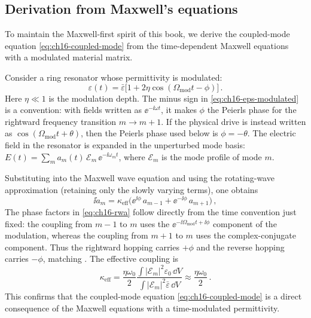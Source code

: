 \subsection{Derivation from Maxwell's equations}
\label{sec:ch16-maxwell-derivation}

To maintain the Maxwell-first spirit of this book, we derive the
coupled-mode equation \eqref{eq:ch16-coupled-mode} from the
time-dependent Maxwell equations with a modulated material matrix.

Consider a ring resonator whose permittivity is modulated:
\begin{equation}\label{eq:ch16-eps-modulated}
  \varepsilon(t) = \bar\varepsilon\bigl[1 + 2\eta\cos(\Omega_{\mathrm{mod}}t-\phi)\bigr] \,.
\end{equation}
Here $\eta\ll 1$ is the modulation depth.  The minus sign in
\eqref{eq:ch16-eps-modulated} is a convention: with fields written as
$\ee^{-\ii\omega t}$, it makes $\phi$ the Peierls phase for the
rightward frequency transition $m\to m+1$.  If the physical drive is
instead written as $\cos(\Omega_{\mathrm{mod}}t+\theta)$, then the
Peierls phase used below is $\phi=-\theta$.  The electric field in the
resonator is expanded in the unperturbed mode basis:
$E(t)=\sum_m a_m(t)\,\mathcal E_m\,\ee^{-\ii\omega_m t}$, where
$\mathcal E_m$ is the mode profile of mode $m$.

Substituting into the Maxwell wave equation and using the rotating-wave
approximation (retaining only the slowly varying terms), one obtains
\begin{equation}\label{eq:ch16-rwa}
  \ii\dot{a}_m = \kappa_{\mathrm{eff}}\bigl(\ee^{\ii\phi}\,a_{m-1}
  + \ee^{-\ii\phi}\,a_{m+1}\bigr)\,,
\end{equation}
The phase factors in \eqref{eq:ch16-rwa} follow directly from the
time convention just fixed: the coupling from $m-1$ to $m$ uses the
$\ee^{-\ii\Omega_{\mathrm{mod}}t+\ii\phi}$ component of the modulation,
whereas the coupling from $m+1$ to $m$ uses the complex-conjugate
component.  Thus the rightward hopping carries $+\phi$ and the reverse
hopping carries $-\phi$, matching .
The effective coupling is
\begin{equation}\label{eq:ch16-coupling}
  \kappa_{\mathrm{eff}} = \frac{\eta\omega_0}{2}
  \frac{\int|\mathcal E_m|^2\varepsilon_0\,\dd V}
  {\int|\mathcal E_m|^2\bar\varepsilon\,\dd V}
  \approx \frac{\eta\omega_0}{2}\,.
\end{equation}
This confirms that the coupled-mode equation
\eqref{eq:ch16-coupled-mode} is a direct consequence of the Maxwell
equations with a time-modulated permittivity.


